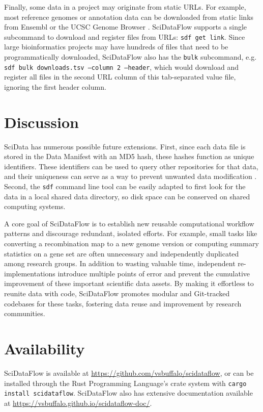 \documentclass[unnumsec,webpdf,contemporary,large]{oup-authoring-template}%
\theoremstyle{thmstyleone}%
\theoremstyle{thmstyletwo}%
\theoremstyle{thmstylethree}%
\begin{document}
Finally, some data in a project may originate from static URLs. For example,
most reference genomes or annotation data can be downloaded from static links
from Ensembl or the UCSC Genome Browser \citep{Cunningham2022-vk,Nassar2023-oo}. SciDataFlow supports a single
subcommand to download and register files from URLs: \texttt{sdf get link}.
Since large bioinformatics projects may have hundreds of files that need to be
programmatically downloaded, SciDataFlow also has the \texttt{bulk} subcommand,
e.g. \texttt{sdf bulk downloads.tsv --column 2 --header}, which would download
and register all files in the second URL column of this tab-separated value
file, ignoring the first header column.

\section{Discussion}
SciData has numerous possible future extensions. First, since each data file
is stored in the Data Manifest with an MD5 hash, these hashes function as unique 
identifiers. These identifiers can be used to query other repositories
for that data, and their uniqueness can serve as a way to prevent unwanted
data modification \citep{Elliott2020-le,Elliott2023-hy}. Second, 
the \texttt{sdf} command line tool can be easily adapted to first look for 
the data in a local shared data directory, so disk space can be conserved on
shared computing systems.

A core goal of SciDataFlow is to establish new reusable computational
workflow patterns and discourage redundant, isolated efforts. For
example, small tasks like converting a recombination map to a new genome
version or computing summary statistics on a gene set are often
unnecessary and independently duplicated among research groups. In
addition to wasting valuable time, independent re-implementations
introduce multiple points of error and prevent the cumulative
improvement of these important scientific data assets. By making it
effortless to reunite data with code, SciDataFlow promotes modular and
Git-tracked codebases for these tasks, fostering data reuse and
improvement by research communities.
\section{Availability}

SciDataFlow is available at \url{https://github.com/vsbuffalo/scidataflow}, or
can be installed through the Rust Programming Language's crate system with
\texttt{cargo install scidataflow}. SciDataFlow also has extensive documentation 
available at \url{https://vsbuffalo.github.io/scidataflow-doc/}.
\end{document}
